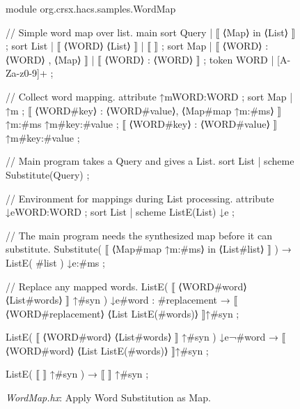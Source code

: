 \documentclass[11pt]{article} %
\begin{document}
\begin{figure}[tp]
\begin{hacs}[numbers=right,texcl]
module org.crsx.hacs.samples.WordMap {

// Simple word map over list.
main sort Query | ⟦ ⟨Map⟩ in ⟨List⟩ ⟧ ;
sort List | ⟦ ⟨WORD⟩ ⟨List⟩ ⟧ | ⟦ ⟧ ;
sort Map | ⟦ ⟨WORD⟩ : ⟨WORD⟩ , ⟨Map⟩ ⟧ | ⟦ ⟨WORD⟩ : ⟨WORD⟩ ⟧ ;
token WORD | [A-Za-z0-9]+ ;

// Collect word mapping.
attribute ↑m{WORD:WORD} ;
sort Map | ↑m ;
⟦ ⟨WORD#key⟩ : ⟨WORD#value⟩, ⟨Map#map ↑m{:#ms}⟩ ⟧ ↑m{:#ms} ↑m{#key:#value} ;
⟦ ⟨WORD#key⟩ : ⟨WORD#value⟩ ⟧ ↑m{#key:#value} ;

// Main program takes a Query and gives a List.
sort List | scheme Substitute(Query) ;

// Environment for mappings during List processing.
attribute ↓e{WORD:WORD} ;
sort List | scheme ListE(List) ↓e ;

// The main program needs the synthesized map before it can substitute.
Substitute( ⟦ ⟨Map#map ↑m{:#ms}⟩ in ⟨List#list⟩ ⟧ ) → ListE( #list ) ↓e{:#ms} ;

// Replace any mapped words.
ListE( ⟦ ⟨WORD#word⟩ ⟨List#words⟩ ⟧ ↑#syn ) ↓e{#word : #replacement}
→ 
⟦ ⟨WORD#replacement⟩ ⟨List ListE(#words)⟩ ⟧↑#syn
;

ListE( ⟦ ⟨WORD#word⟩ ⟨List#words⟩ ⟧ ↑#syn ) ↓e{¬#word}
→ 
⟦ ⟨WORD#word⟩ ⟨List ListE(#words)⟩ ⟧↑#syn
;

ListE( ⟦ ⟧ ↑#syn ) → ⟦ ⟧ ↑#syn ;
}
\end{hacs}
\caption{\emph{WordMap.hx}: Apply Word Substitution as Map.}
\label{fig:wordmap}
\end{figure}
\end{document}
